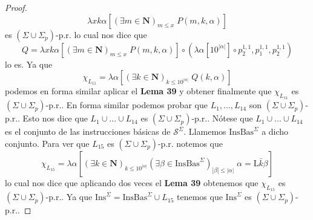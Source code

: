 \begin{lemma}
\begin{proof}
\[      \displaystyle \lambda xk\alpha \left[ (\exists m\in \mathbf{N})_{m\leq x}\;P(m,k,\alpha ) \right]
    \]
    es $(\Sigma \cup \Sigma _{p})$-p.r. lo cual nos dice que
    \[
      \displaystyle Q=\lambda xk\alpha \left[ (\exists m\in \mathbf{N})_{m\leq x}\;P(m,k,\alpha ) \right] \circ
      (\lambda \alpha \left[ 10^{\left\vert \alpha \right\vert } \right] \circ p_{2}^{1,1},p_{1}^{1,1},p_{2}^{1,1})
    \]
    lo es. Ya que
    \[
      \displaystyle \chi _{L_{11}}=\lambda \alpha \left[ (\exists k\in \mathbf{N})_{k\leq 10^{\left\vert \alpha \right
      \vert }}\;Q(k,\alpha )\right]
    \]
    podemos en forma similar aplicar el \textbf{Lema 39} y obtener finalmente que $\chi _{L_{11}}$ es
    $(\Sigma \cup \Sigma _{p})$-p.r..
    En forma similar podemos probar que $L_{1},...,L_{14}$ son $(\Sigma \cup \Sigma _{p})$-p.r..
    Esto nos dice que $L_{1}\cup ...\cup L_{14}$ es $(\Sigma \cup \Sigma _{p})$-p.r..
    Nótese que $L_{1}\cup ...\cup L_{14}$ es el conjunto de las instrucciones básicas de $\mathcal{S}^{\Sigma }$.
    Llamemos $ \mathrm{InsBas}^{\Sigma }$ a dicho conjunto.
    Para ver que $L_{15}$ es $ (\Sigma \cup \Sigma _{p})$-p.r. notemos que
    \[
      \displaystyle \chi _{L_{15}}=\lambda \alpha \left[ (\exists k\in \mathbf{N})_{k\leq 10^{\left\vert \alpha \right
      \vert }}(\exists \beta \in \mathrm{InsBas} ^{\Sigma })_{\left\vert \beta \right\vert \leq \left\vert \alpha \right
      \vert }\;\alpha =\mathrm{L}\bar{k}\beta \right]
    \]
    lo cual nos dice que aplicando dos veces el \textbf{Lema 39} obtenemos que $\chi _{L_{15}}$ es $(\Sigma \cup \Sigma _{p})
    $-p.r.. Ya que $ \mathrm{Ins}^{\Sigma }=\mathrm{InsBas}^{\Sigma }\cup L_{15}$ tenemos que
    $ \mathrm{Ins}^{\Sigma }$ es $(\Sigma \cup \Sigma _{p})$-p.r..
  \end{proof}
  \end{lemma}

